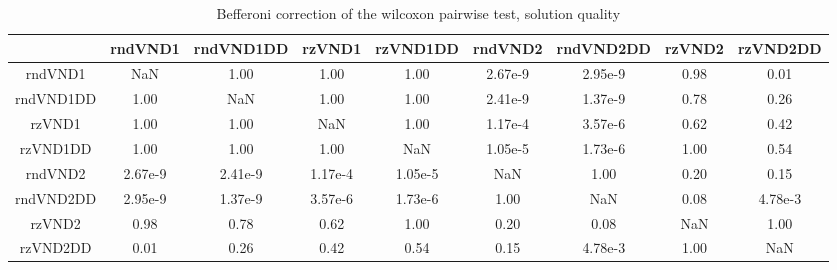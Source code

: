 \documentclass[12pt,a4paper]{article}
\begin{document}
\begin{table}[!h]
\leftskip -1.6cm
{
\footnotesize
\begin{tabular}{|*{9}{c|}}
  \hline
	 & rndVND1 & rndVND1DD & rzVND1 & rzVND1DD & rndVND2 & rndVND2DD & rzVND2 & rzVND2DD \\
  \hline
	rndVND1 & NaN & 1.00 & 1.00 & 1.00 & 2.67e-9 & 2.95e-9 & 0.98 & 0.01 \\
	rndVND1DD & 1.00 & NaN & 1.00 & 1.00 & 2.41e-9 & 1.37e-9 & 0.78 & 0.26 \\
	rzVND1 & 1.00 & 1.00 & NaN & 1.00 & 1.17e-4 & 3.57e-6 & 0.62 & 0.42 \\
	rzVND1DD & 1.00 & 1.00 & 1.00 & NaN & 1.05e-5 & 1.73e-6 & 1.00 & 0.54 \\
	rndVND2 & 2.67e-9 & 2.41e-9 & 1.17e-4 & 1.05e-5 & NaN & 1.00 & 0.20 & 0.15 \\
	rndVND2DD & 2.95e-9 & 1.37e-9 & 3.57e-6 & 1.73e-6 & 1.00 & NaN & 0.08 & 4.78e-3 \\
	rzVND2 & 0.98 & 0.78 & 0.62 & 1.00 & 0.20 & 0.08 & NaN & 1.00 \\
	rzVND2DD & 0.01 & 0.26 & 0.42 & 0.54 & 0.15 & 4.78e-3 & 1.00 & NaN \\
  \hline
\end{tabular}
\normalsize
}
\caption{Befferoni correction of the wilcoxon pairwise test, solution quality}
\label{Befferoni correction of the wilcoxon pairwise test VND}
\end{table} 
\end{document}
